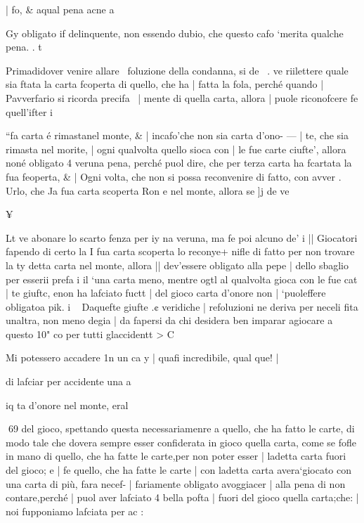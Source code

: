 \documentclass[12pt,a6paper]{article}
\begin{document}
| fo, & aqual pena acne a

 

 

 

 

 

 
  
  

Gy
obligato if delinquente, non
essendo dubio, che questo cafo
‘merita qualche pena. . t

Primadidover venire allare~
foluzione della condanna, si de~ .
ve riilettere quale sia ftata la
carta fcoperta di quello, che ha |
fatta la fola, perché quando |
Pavverfario si ricorda precifa~ |
mente di quella carta, allora |
puole riconofcere fe quell’ifter i

“fa carta é rimastanel monte, & |
incafo'che non sia carta d’ono- — |
te, che sia rimasta nel morite, |
ogni qualvolta quello sioca con |
le fue carte ciufte’, allora noné
obligato 4 veruna pena, perché
puol dire, che per terza carta
ha fcartata la fua feoperta, & |
Ogni volta, che non si possa reconvenire di fatto, con avver
. Urlo, che Ja fua carta scoperta
Ron e nel monte, allora se ]j de
ve

 

 

¥

 
 

Lt ve abonare lo scarto fenza per
iy na veruna, ma fe poi alcuno de’
i || Giocatori fapendo di certo la
I fua carta scoperta lo reconye+ nifle di fatto per non trovare la
ty detta carta nel monte, allora
|| dev’essere obligato alla pepe
| dello sbaglio per esserii prefa
i il ‘una carta meno, mentre ogtl
al qualvolta gioca con le fue cat
| te giuftc, enon ha lafciato fuctt
| del gioco carta d’onore non
| ‘puoleffere obligatoa pik.
i ~ Daquefte giufte .¢ veridiche
| refoluzioni ne deriva per neceli fita unaltra, non meno degia
| da fapersi da chi desidera ben
imparar agiocare a questo 10"
co per tutti glaccidentt > C

Mi potessero accadere 1n un ca y
| quafi incredibile, qual que!
|

 

 

di lafciar per accidente una a

iq ta d’onore nel monte, eral

 

 

 

 
69
del gioco, spettando questa necessariamenre a quello, che ha
fatto le carte, di modo tale che
dovera sempre esser confiderata
in gioco quella carta, come se
fofle in mano di quello, che ha
fatte le carte,per non poter esser |
ladetta carta fuori del gioco; e |
fe quello, che ha fatte le carte |
con ladetta carta avera‘giocato
con una carta di più, fara necef- |
fariamente obligato avoggiacer |
alla pena di non contare,perché |
puol aver lafciato 4 bella pofta |
fuori del gioco quella carta;che: |
noi fupponiamo lafciata per ac
:
\end{document}

